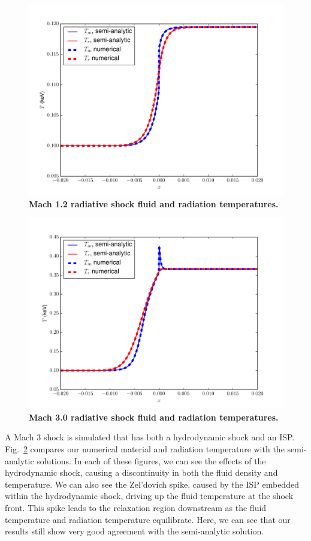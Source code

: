 \documentclass[preprint,12pt]{elsarticle}
\begin{document}
\begin{figure}[ht!]
\centering
\includegraphics[width=\textwidth]{figures/radshock_mach_1_2.pdf}
\caption{\label{fig:mach1.2T}\bf Mach 1.2 radiative shock fluid and radiation temperatures.} 
\end{figure}

\begin{figure}[ht!]
\centering
\includegraphics[width=\textwidth]{figures/radshock_mach_3_0.pdf}
\caption{\label{fig:mach3.0T}\bf Mach 3.0 radiative shock fluid and radiation temperatures.} 
\end{figure}


A Mach 3 shock is simulated that has both a hydrodynamic shock and an ISP.
Fig.~\ref{fig:mach3.0T} compares our numerical material and radiation temperature with the semi-analytic solutions.  In each of these
figures, we can see the effects of the hydrodynamic shock, causing a discontinuity in both the fluid density and
temperature.  We can also see the Zel'dovich spike, caused by the ISP embedded within the hydrodynamic shock, driving up
the fluid temperature at the shock front.  This spike leads to the relaxation region downstream as the fluid temperature
and radiation temperature equilibrate. Here, we can see that our results still show very good agreement with the semi-analytic solution.
\end{document}
